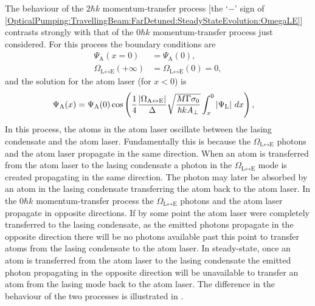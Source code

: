 The behaviour of the $2 \hbar k$ momentum-transfer process [the `$-$' sign of \eqref{OpticalPumping:TravellingBeam:FarDetuned:SteadyStateEvolution:OmegaLE}] contrasts strongly with that of the $0 \hbar k$ momentum-transfer process just considered.  For this process the boundary conditions are
\begin{subequations}
    \begin{align}
        \Psi_\text{A}(x=0) &= \Psi_\text{A}(0), \\
        \Omega_{\text{L} \leftrightarrow \text{E}}(+\infty) &= \Omega_{\text{L} \leftrightarrow \text{E}}(0) = 0,
    \end{align}
\end{subequations}
and the solution for the atom laser (for $x < 0$) is
\begin{align}
    \Psi_\text{A}(x) &= \Psi_\text{A}(0) \cos \left(\frac{1}{4} \frac{\left|\Omega_{\text{A} \leftrightarrow \text{E}}\right|}{\Delta} \sqrt{\frac{M \Gamma \sigma_0}{\hbar k A_\perp}} \int_{x}^{0} \left|\Psi_\text{L}\right| \, dx\right),
\end{align}
In this process, the atoms in the atom laser oscillate between the lasing condensate and the atom laser.  Fundamentally this is because the $\Omega_{\text{L} \leftrightarrow \text{E}}$ photons and the atom laser propagate in the same direction. When an atom is transferred from the atom laser to the lasing condensate a photon in the $\Omega_{\text{L} \leftrightarrow \text{E}}$ mode is created propagating in the same direction.  The photon may later be absorbed by an atom in the lasing condensate transferring the atom back to the atom laser.  In the $0 \hbar k$ momentum-transfer process the $\Omega_{\text{L} \leftrightarrow \text{E}}$ photons and the atom laser propagate in opposite directions.   If by some point the atom laser were completely transferred to the lasing condensate, as the emitted photons propagate in the opposite direction there will be no photons available past this point to transfer atoms from the lasing condensate to the atom laser.  In steady-state, once an atom is transferred from the atom laser to the lasing condensate the emitted photon propagating in the opposite direction will be unavailable to transfer an atom from the lasing mode back to the atom laser.  The difference in the behaviour of the two processes is illustrated in .

